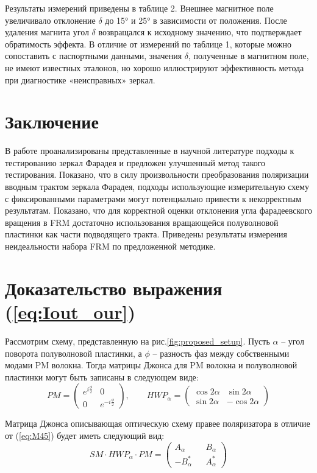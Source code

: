 \documentclass{article}
\begin{document}
Результаты измерений приведены в таблице 2.
Внешнее магнитное поле увеличивало отклонение $\delta$ до 15° и 25° в зависимости от положения.
После удаления магнита угол $\delta$ возвращался к исходному значению, что подтверждает обратимость эффекта.
В отличие от измерений по таблице 1, которые можно сопоставить с паспортными данными, значения $\delta$, полученные в магнитном поле, не имеют известных эталонов, но хорошо иллюстрируют эффективность метода при диагностике «неисправных» зеркал.


\clearpage
\section{Заключение}
В работе проанализированы представленные в научной литературе подходы к тестированию зеркал Фарадея и предложен улучшенный метод такого тестирования.
Показано, что в силу произвольности преобразования поляризации вводным трактом зеркала Фарадея, подходы использующие измерительную схему с фиксированными параметрами могут потенциально привести к некорректным результатам.
Показано, что для корректной оценки отклонения угла фарадеевского вращения в FRM достаточно использования вращающейся полуволновой пластинки как части подводящего тракта.
Приведены результаты измерения неидеальности набора FRM по предложенной методике.

\appendix
{}
\section{Доказательство выражения (\ref{eq:Iout_our})}
Рассмотрим схему, представленную на рис.\ref{fig:proposed_setup}.
Пусть $\alpha$ – угол поворота полуволновой пластинки, а $\phi$ – разность фаз между собственными модами PM волокна.
Тогда матрицы Джонса для PM волокна и полуволновой пластинки могут быть записаны в следующем виде:
\begin{equation}
	PM = 
	\begin{pmatrix}
		e^{i\frac{\phi}{2}} & 0 \\
		0 & e^{-i\frac{\phi}{2}}
	\end{pmatrix},\qquad 
	HWP_\alpha = 
	\begin{pmatrix}
		\cos 2 \alpha & \sin 2 \alpha \\
		\sin 2 \alpha & -\cos 2 \alpha
	\end{pmatrix}
\end{equation}

Матрица Джонса описывающая оптическую схему правее поляризатора в отличие от (\ref{eq:M45}) будет иметь следующий вид:
\begin{equation}
	SM \cdot HWP_\alpha \cdot PM =
	\begin{pmatrix} 
		A_\alpha 	&& 	B_\alpha \\
		-B_\alpha^* && 	A_\alpha^*
	\end{pmatrix}
\end{equation}
\end{document}
